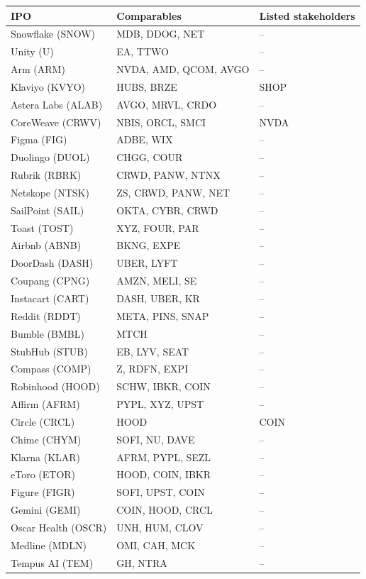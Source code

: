 {\scriptsize
\begin{longtable}{lll}
\toprule IPO & Comparables & Listed stakeholders \\ \midrule \endhead
Snowflake (SNOW) & MDB, DDOG, NET & -- \\
Unity (U) & EA, TTWO & -- \\
Arm (ARM) & NVDA, AMD, QCOM, AVGO & -- \\
Klaviyo (KVYO) & HUBS, BRZE & SHOP \\
Astera Labs (ALAB) & AVGO, MRVL, CRDO & -- \\
CoreWeave (CRWV) & NBIS, ORCL, SMCI & NVDA \\
Figma (FIG) & ADBE, WIX & -- \\
Duolingo (DUOL) & CHGG, COUR & -- \\
Rubrik (RBRK) & CRWD, PANW, NTNX & -- \\
Netskope (NTSK) & ZS, CRWD, PANW, NET & -- \\
SailPoint (SAIL) & OKTA, CYBR, CRWD & -- \\
Toast (TOST) & XYZ, FOUR, PAR & -- \\
Airbnb (ABNB) & BKNG, EXPE & -- \\
DoorDash (DASH) & UBER, LYFT & -- \\
Coupang (CPNG) & AMZN, MELI, SE & -- \\
Instacart (CART) & DASH, UBER, KR & -- \\
Reddit (RDDT) & META, PINS, SNAP & -- \\
Bumble (BMBL) & MTCH & -- \\
StubHub (STUB) & EB, LYV, SEAT & -- \\
Compass (COMP) & Z, RDFN, EXPI & -- \\
Robinhood (HOOD) & SCHW, IBKR, COIN & -- \\
Affirm (AFRM) & PYPL, XYZ, UPST & -- \\
Circle (CRCL) & HOOD & COIN \\
Chime (CHYM) & SOFI, NU, DAVE & -- \\
Klarna (KLAR) & AFRM, PYPL, SEZL & -- \\
eToro (ETOR) & HOOD, COIN, IBKR & -- \\
Figure (FIGR) & SOFI, UPST, COIN & -- \\
Gemini (GEMI) & COIN, HOOD, CRCL & -- \\
Oscar Health (OSCR) & UNH, HUM, CLOV & -- \\
Medline (MDLN) & OMI, CAH, MCK & -- \\
Tempus AI (TEM) & GH, NTRA & -- \\

\end{longtable}}
